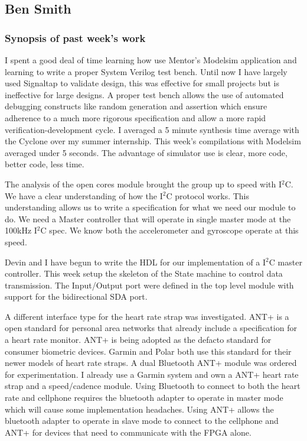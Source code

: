 \documentclass[12pt,compsoc]{IEEEtran}
\begin{document}
\subsection{Ben Smith}

	\subsubsection*{Synopsis of past week's work}
	I spent a good deal of time learning how use Mentor's Modelsim application and learning to write 
	a proper System Verilog test bench. Until now I have largely used Signaltap to validate design, 
	this was effective for small projects but is ineffective for large designs. A proper test bench 
	allows the use of automated debugging constructs like random generation and assertion which 
	ensure adherence to a much more rigorous specification and allow a more rapid verification-development 
	cycle. I averaged a 5 minute synthesis time average with the Cyclone over my summer internship. 
	This week’s compilations with Modelsim averaged under 5 seconds. The advantage of simulator 
	use is clear, more code, better code, less time.
	
	The analysis of the open cores module brought the group up to speed with I$^2$C. We have a clear
	understanding of how the I$^2$C protocol works. This understanding allows us to write a specification
	for what we need our module to do. We need a Master controller that will operate in single master
	mode at the 100kHz I$^2$C spec. We know both the accelerometer and gyroscope operate at this speed.

	Devin and I have begun to write the HDL for our implementation of a I$^2$C master controller. This
	week setup the skeleton of the State machine to control data transmission. The Input/Output port
	were defined in the top level module with support for the bidirectional SDA port.

	A different interface type for the heart rate strap was investigated. ANT+ is a open standard for
	personal area networks that already include a specification for a heart rate monitor. ANT+ is
	being adopted as the defacto standard for consumer biometric devices. Garmin and Polar both use
	this standard for their newer models of heart rate straps. A dual Bluetooth ANT+ module was ordered
	for experimentation. I already use a Garmin system and own a ANT+ heart rate strap and a speed/cadence
	module. Using Bluetooth to connect to both the heart rate and cellphone requires the bluetooth adapter
	to operate in master mode which will cause some implementation headaches. Using ANT+ allows the bluetooth
	adapter to operate in slave mode to connect to the cellphone and ANT+ for devices that need to communicate
	with the FPGA alone.
\end{document}
